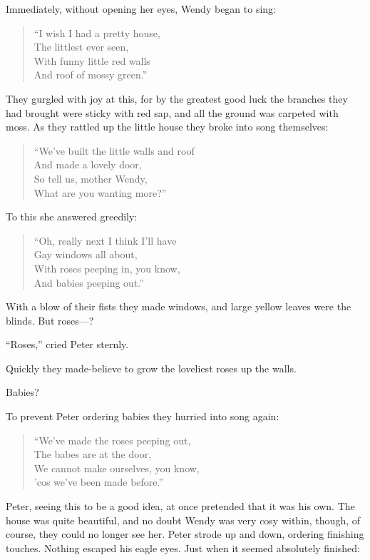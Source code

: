 Immediately, without opening her eyes, Wendy began to sing:

\begin{verse}
	“I wish I had a pretty house,\\
	The littlest ever seen,\\
	With funny little red walls\\
	And roof of mossy green.”
\end{verse}

They gurgled with joy at this,
for by the greatest good luck the branches they had brought were sticky with red sap,
and all the ground was carpeted with moss.
As they rattled up the little house they broke into song themselves:

\begin{verse}
	“We’ve built the little walls and roof\\
	And made a lovely door,\\
	So tell us, mother Wendy,\\
	What are you wanting more?”
\end{verse}

To this she answered greedily:

\begin{verse}
	“Oh, really next I think I’ll have\\
	Gay windows all about,\\
	With roses peeping in, you know,\\
	And babies peeping out.”
\end{verse}

With a blow of their fists they made windows,
and large yellow leaves were the blinds.
But roses—?

“Roses,” cried Peter sternly.

Quickly they made-believe to grow the loveliest roses up the walls.

Babies?

To prevent Peter ordering babies they hurried into song again:

\begin{verse}
	“We’ve made the roses peeping out,\\
	The babes are at the door,\\
	We cannot make ourselves, you know,\\
	’cos we’ve been made before.”
\end{verse}

Peter, seeing this to be a good idea, at once pretended that it was his own.
The house was quite beautiful, and no doubt Wendy was very cosy within,
though, of course, they could no longer see her.
Peter strode up and down, ordering finishing touches.
Nothing escaped his eagle eyes.
Just when it seemed absolutely finished:

